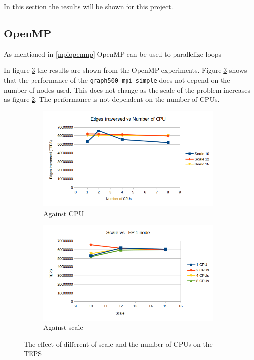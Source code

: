 In this section the results will be shown for this project.

\subsection{OpenMP}
\label{sec:openmp}
As mentioned in \ref{mpiopenmp} OpenMP can be used to parallelize loops.

In figure \ref{fig:openmp_scale_cpu} the results are shown from the OpenMP experiments. 
Figure \ref{fig:openmp_scale_cpu} shows that the performance of the \texttt{graph500\_mpi\_simple} does not depend on the number of nodes used. This does not change as the scale of the problem increases as figure \ref{fig:openmp_scale}. The performance is not dependent on the number of CPUs.    

\begin{figure}[!h]
\centering
\begin{subfigure}{.5\textwidth}
  \centering
  \includegraphics[width=\linewidth]{images/openmp_cpus.png}
  \caption{Against CPU}
  \label{fig:openmp_cpu}
\end{subfigure}%
\begin{subfigure}{.5\textwidth}
  \centering
  \includegraphics[width=\linewidth]{images/openmp_scale.png}
  \caption{Against scale}
  \label{fig:openmp_scale}
\end{subfigure}
\caption{The effect of different of scale and the number of CPUs on the TEPS}
\label{fig:openmp_scale_cpu}
\end{figure}

